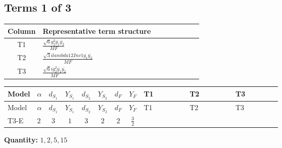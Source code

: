 \documentclass[8pt]{article}
\begin{document}
\begin{landscape}
\subsection*{Terms 1 of 3}
\begin{center}
\begin{tabular}{@{}c >{\raggedright\arraybackslash}p{0.82\linewidth}@{}}
\toprule
Column & Representative term structure \\
\midrule
T1 & \(\displaystyle \frac{\sqrt{6} g_{2}^{2} \overline{y_{1}} \overline{y_{2}}}{MF}\) \\
\midrule
T2 & \(\displaystyle \frac{\sqrt{3} i lambda12Inv1 \overline{y_{1}} \overline{y_{2}}}{MF}\) \\
\midrule
T3 & \(\displaystyle \frac{\sqrt{6} i g_{2}^{2} \overline{y_{1}} \overline{y_{2}}}{MF}\) \\
\midrule
\bottomrule
\end{tabular}
\end{center}
\smallskip
\tiny
\begin{longtable}{@{}llcccccc >{\raggedright\arraybackslash}p{0.21\linewidth} >{\raggedright\arraybackslash}p{0.21\linewidth} >{\raggedright\arraybackslash}p{0.21\linewidth}@{}}
\toprule
Model & $\alpha$ & $d_{S_1}$ & $Y_{S_1}$ & $d_{S_2}$ & $Y_{S_2}$ & $d_F$ & $Y_F$ & T1 & T2 & T3 \\
\midrule
\endfirsthead
\toprule
Model & $\alpha$ & $d_{S_1}$ & $Y_{S_1}$ & $d_{S_2}$ & $Y_{S_2}$ & $d_F$ & $Y_F$ & T1 & T2 & T3 \\
\midrule
\endhead
T3-E & $2$ & $3$ & $1$ & $3$ & $2$ & $2$ & $\frac{3}{2}$ & \scriptsize\adjustbox{max width=\linewidth}{$\begin{gathered} - \frac{\sqrt{6} g_{2}^{2} \overline{y_{1}} \overline{y_{2}}}{6 MF}\end{gathered}$} & \scriptsize\adjustbox{max width=\linewidth}{$\begin{gathered} - \frac{\sqrt{3} i lambda12Inv1 \overline{y_{1}} \overline{y_{2}}}{6 MF}\end{gathered}$} & \scriptsize\adjustbox{max width=\linewidth}{$\begin{gathered} \frac{\sqrt{6} i g_{2}^{2} \overline{y_{1}} \overline{y_{2}}}{6 MF}\end{gathered}$} \\
\midrule
\bottomrule
\end{longtable}
\clearpage
\noindent\textbf{Quantity: }$\mathrm{1,2,5,15}$\par\smallskip

\end{landscape}
\end{document}

